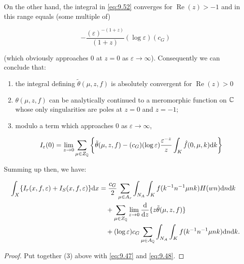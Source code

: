 On the other hand, the integral in \eqref{eq:9.52} converges for $\operatorname{Re}(z) > -1$ and in this range equals (some multiple of)

\[
-\frac{(\varepsilon)^{-(1+z)}}{(1+z)}(\log\varepsilon)(c_G)
\]

(which obviously approaches 0 at $z = 0$ as $\varepsilon \to \infty$). Consequently we can conclude that:

\begin{enumerate}[(1)]

\item the integral defining $\tilde{\theta}(\mu, z, f)$ is absolutely convergent for $\operatorname{Re}(z) > 0$

\item $\theta(\mu, z, f)$ can be analytically continued to a meromorphic function on $\mathbb{C}$ whose only singularities are poles at $z = 0$ and $z = -1$;

\item modulo a term which approaches 0 as $\varepsilon \to \infty$,

\[
I_\varepsilon(0) = \lim_{z \to 0}\sum_{\mu \in Z_{\mathbb{Q}}}\left\{\tilde{\theta}(\mu, z, f) - (c_G)(\log\varepsilon)\frac{\varepsilon^{-z}}{z}\int_K \hat{f}(0, \mu, k)\mathrm{d} k\right\}
\]

\end{enumerate}

Summing up then, we have:

\begin{proposition}\label{prop:9.17}

\[
\begin{aligned}
\int_X \{I_r(x, f, \varepsilon) + I_S(x, f, \varepsilon)\}\mathrm{d} x &= \frac{c_G}{2}\sum_{\mu \in A_r}\int_{N_A}\int_K f(k^{-1}n^{-1}\mu nk)H(wn)\mathrm{d} n\mathrm{d} k\\
&\quad + \sum_{\mu \in Z_{\mathbb{Q}}}\lim_{z \to 0}\frac{\mathrm{d}}{\mathrm{d} z}\{z\tilde{\theta}(\mu, z, f)\}\\
&\quad + (\log\varepsilon)c_G\sum_{\mu \in A_{\mathbb{Q}}}\int_{N_A}\int_K f(k^{-1}n^{-1}\mu nk)\mathrm{d} n\mathrm{d} k.
\end{aligned}
\]

\end{proposition}

\begin{proof}

Put together (3) above with \eqref{eq:9.47} and \eqref{eq:9.48}.

\end{proof}


